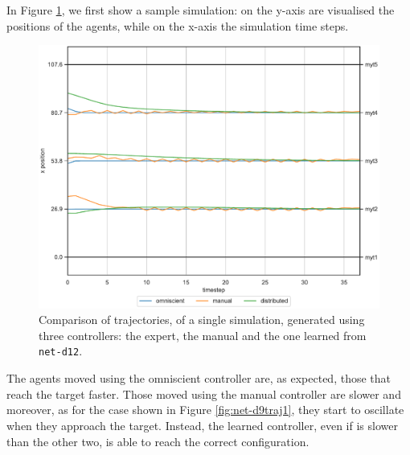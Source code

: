 In Figure \ref{fig:net-d12traj1}, we first show a sample simulation: on the y-axis 
are visualised the positions of the agents, while on the x-axis the simulation time 
steps. 
\begin{figure}[!htb]
	\centering
	\includegraphics[width=.7\textwidth]{contents/images/net-d12/animation-distributed}%
	\caption[Evaluation of the trajectories obtained with 5 agents.]{Comparison of 
	trajectories, of a single simulation, generated using three 
		controllers: the expert, the manual and the one learned from 
		\texttt{net-d12}.}
	\label{fig:net-d12traj1}
\end{figure}
The agents moved using the omniscient controller are, as expected, those that 
reach the target faster. Those moved using the manual controller are slower and 
moreover, as for the case shown in Figure \ref{fig:net-d9traj1}, they start to 
oscillate when they approach the target. Instead, the learned controller, even if is 
slower than the other two, is able to reach the correct configuration. 

